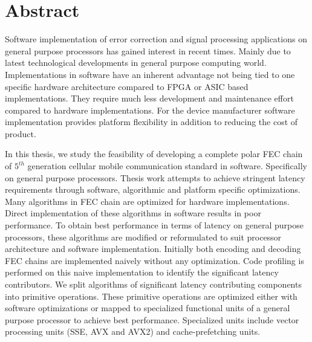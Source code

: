 \chapter*{Abstract}
Software implementation of error correction and signal processing applications on general purpose processors has gained interest in recent times. Mainly due to latest technological developments in general purpose computing world. Implementations in software have an inherent advantage not being tied to one specific hardware architecture compared to FPGA or ASIC based implementations. They require much less development and maintenance effort compared to hardware implementations. For the device manufacturer software implementation provides platform flexibility in addition to reducing the cost of product. \newline

In this thesis, we study the feasibility of developing a complete polar FEC chain of $5^{th}$ generation cellular mobile communication standard \cite{3gpp.38.212} in software. Specifically on general purpose processors. Thesis work attempts to achieve stringent latency requirements through software, algorithmic and platform specific optimizations. Many algorithms in FEC chain are optimized for hardware implementations. Direct implementation of these algorithms in software results in poor performance. To obtain best performance in terms of latency on general purpose processors, these algorithms are modified or reformulated to suit processor architecture and software implementation. Initially both encoding and decoding FEC chains are implemented naively without any optimization. Code profiling is performed on this naive implementation to identify the significant latency contributors. We split algorithms of significant latency contributing components into primitive operations. These primitive operations are optimized either with software optimizations or mapped to specialized functional units of a general purpose processor to achieve best performance. Specialized units include vector processing units (SSE, AVX and AVX2) and cache-prefetching units. \newline

